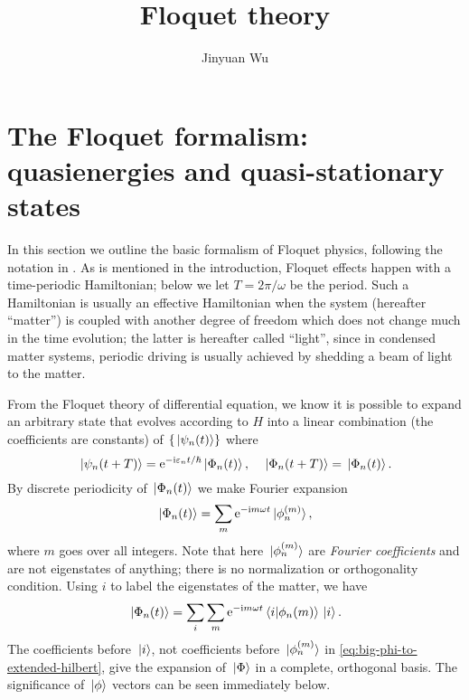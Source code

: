 \documentclass[hyperref, a4paper]{article}
\title{Floquet theory}
\author{Jinyuan Wu}
\newcommand*{\ii}{\mathrm{i}}
\newcommand*{\ee}{\mathrm{e}}
\begin{document}
\maketitle


\section{The Floquet formalism: quasienergies and quasi-stationary states}

In this section we outline the basic formalism of Floquet physics,
following the notation in \cite{rudner2020floquet}.
As is mentioned in the introduction,
Floquet effects happen with a time-periodic Hamiltonian;
below we let $T = 2 \pi / \omega$ be the period.
Such a Hamiltonian is usually an effective Hamiltonian
when the system (hereafter ``matter'')
is coupled with another degree of freedom
which does not change much in the time evolution;
the latter is hereafter called ``light'',
since in condensed matter systems, 
periodic driving is usually achieved by 
shedding a beam of light to the matter.

From the Floquet theory of differential equation, 
we know it is possible to expand an arbitrary state that 
evolves according to $H$ into 
a linear combination (the coefficients are constants) of 
$\{\ket*{\psi_n(t)}\}$ where 
\begin{equation}
    \ket*{\psi_n (t + T)} = \ee^{- \ii \varepsilon_n t / \hbar} \ket*{\Phi_n(t)},
    \quad \ket*{\Phi_n(t + T)} = \ket*{\Phi_n(t)}.
    \label{eq:floquet-wave-function}
\end{equation}
By discrete periodicity of $\ket*{\Phi_n(t)}$ we make Fourier expansion 
\begin{equation}
    \ket*{\Phi_n(t)} = \sum_m \ee^{- \ii m \omega t} \ket*{\phi_n^{(m)}},
    \label{eq:big-phi-to-extended-hilbert}
\end{equation}
where $m$ goes over all integers.
Note that here $\ket*{\phi_n^{(m)}}$
are \emph{Fourier coefficients} and are not eigenstates of anything; 
there is no normalization or orthogonality condition.
Using $i$ to label the eigenstates of the matter, 
we have 
\begin{equation}
    \ket*{\Phi_n(t)} = \sum_{i} \sum_{m}
    \ee^{- \ii m \omega t} \braket*{i}{\phi_n(m)} \ket*{i}.
\end{equation}
The coefficients before $\ket*{i}$, 
not coefficients before $\ket*{\phi_n^{(m)}}$ in \eqref{eq:big-phi-to-extended-hilbert}, 
give the expansion of $\ket*{\Phi}$ in a 
complete, orthogonal basis.
The significance of $\ket*{\phi}$ vectors can be seen immediately below.
\end{document}
